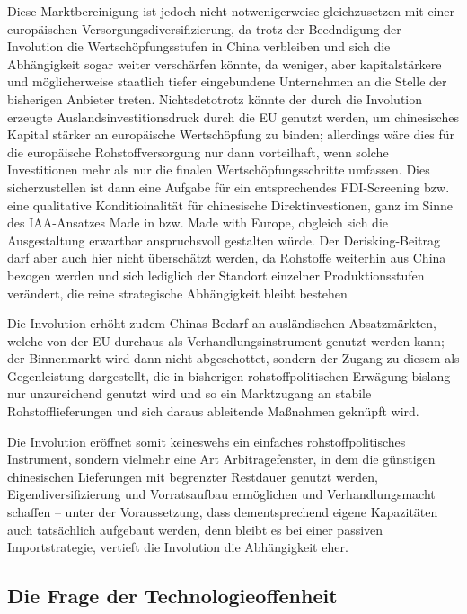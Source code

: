 \documentclass[12pt,a4paper,oneside]{book} %
\begin{document}
{Diese Marktbereinigung ist jedoch nicht notwenigerweise gleichzusetzen mit einer europäischen Versorgungsdiversifizierung, da trotz der Beedndigung der Involution die Wertschöpfungsstufen in China verbleiben und sich die Abhängigkeit sogar weiter verschärfen könnte, da weniger, aber kapitalstärkere und möglicherweise staatlich tiefer eingebundene Unternehmen an die Stelle der bisherigen Anbieter treten. Nichtsdetotrotz könnte der durch die Involution erzeugte Auslandsinvestitionsdruck durch die EU genutzt werden, um chinesisches Kapital stärker an europäische Wertschöpfung zu binden; allerdings wäre dies für die europäische Rohstoffversorgung nur dann vorteilhaft, wenn solche Investitionen mehr als nur die finalen Wertschöpfungsschritte umfassen. Dies sicherzustellen ist dann eine Aufgabe für ein entsprechendes FDI-Screening bzw. eine qualitative Konditioinalität für chinesische Direktinvestionen, ganz im Sinne des IAA-Ansatzes Made in bzw. Made with Europe, obgleich sich die Ausgestaltung erwartbar anspruchsvoll gestalten würde. Der Derisking-Beitrag darf aber auch hier nicht überschätzt werden, da Rohstoffe weiterhin aus China bezogen werden und sich lediglich der Standort einzelner Produktionsstufen verändert, die reine strategische Abhängigkeit bleibt bestehen

Die Involution erhöht zudem Chinas Bedarf an ausländischen Absatzmärkten, welche von der EU durchaus als Verhandlungsinstrument genutzt werden kann; der Binnenmarkt wird dann nicht abgeschottet, sondern der Zugang zu diesem als Gegenleistung dargestellt, die in bisherigen rohstoffpolitischen Erwägung bislang nur unzureichend genutzt wird und so ein Marktzugang an stabile Rohstofflieferungen und sich daraus ableitende Maßnahmen geknüpft wird.

Die Involution eröffnet somit keineswehs ein einfaches rohstoffpolitisches Instrument, sondern vielmehr eine Art Arbitragefenster, in dem die günstigen chinesischen Lieferungen mit begrenzter Restdauer genutzt werden, Eigendiversifizierung und Vorratsaufbau ermöglichen und Verhandlungsmacht schaffen -- unter der Voraussetzung, dass dementsprechend eigene Kapazitäten auch tatsächlich aufgebaut werden, denn bleibt es bei einer passiven Importstrategie, vertieft die Involution die Abhängigkeit eher.

\subsection{Die Frage der Technologieoffenheit}

}
\end{document}
